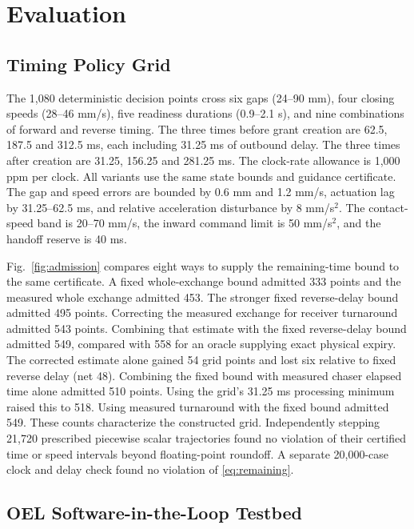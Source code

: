 \documentclass{IEEEtaes}
\begin{document}
\section{Evaluation}

\subsection{Timing Policy Grid}

The 1,080 deterministic decision points cross six gaps (24--90 mm), four closing speeds (28--46 mm/s), five readiness durations (0.9--2.1 s), and nine combinations of forward and reverse timing. The three times before grant creation are 62.5, 187.5 and 312.5 ms, each including 31.25 ms of outbound delay. The three times after creation are 31.25, 156.25 and 281.25 ms. The clock-rate allowance is 1,000 ppm per clock. All variants use the same state bounds and guidance certificate. The gap and speed errors are bounded by 0.6 mm and 1.2 mm/s, actuation lag by 31.25--62.5 ms, and relative acceleration disturbance by 8 mm/s$^2$. The contact-speed band is 20--70 mm/s, the inward command limit is 50 mm/s$^2$, and the handoff reserve is 40 ms.

Fig.~\ref{fig:admission} compares eight ways to supply the remaining-time bound to the same certificate. A fixed whole-exchange bound admitted 333 points and the measured whole exchange admitted 453. The stronger fixed reverse-delay bound admitted 495 points. Correcting the measured exchange for receiver turnaround admitted 543 points. Combining that estimate with the fixed reverse-delay bound admitted 549, compared with 558 for an oracle supplying exact physical expiry. The corrected estimate alone gained 54 grid points and lost six relative to fixed reverse delay (net 48). Combining the fixed bound with measured chaser elapsed time alone admitted 510 points. Using the grid's 31.25 ms processing minimum raised this to 518. Using measured turnaround with the fixed bound admitted 549. These counts characterize the constructed grid. Independently stepping 21,720 prescribed piecewise scalar trajectories found no violation of their certified time or speed intervals beyond floating-point roundoff. A separate 20,000-case clock and delay check found no violation of \eqref{eq:remaining}.

\subsection{OEL Software-in-the-Loop Testbed}
\label{sec:oel-testbed}
\end{document}
